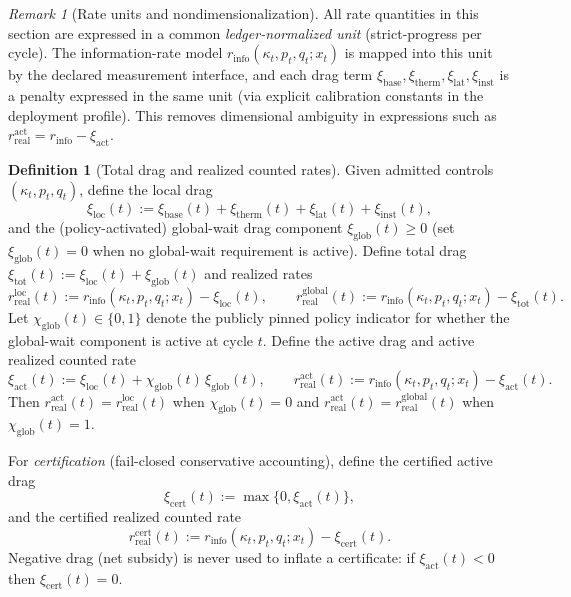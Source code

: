 \documentclass[11pt,a4paper]{article}
\theoremstyle{definition}
\newtheorem{definition}{Definition}
\theoremstyle{remark}
\newtheorem{remark}{Remark}
\begin{document}
\begin{remark}[Rate units and nondimensionalization]
All rate quantities in this section are expressed in a common \emph{ledger-normalized unit} (strict-progress per cycle). The information-rate model $r_{\mathrm{info}}(\kappa_t,p_t,q_t;x_t)$ is mapped into this unit by the declared measurement interface, and each drag term $\xi_{\mathrm{base}},\xi_{\mathrm{therm}},\xi_{\mathrm{lat}},\xi_{\mathrm{inst}}$ is a penalty expressed in the same unit (via explicit calibration constants in the deployment profile). This removes dimensional ambiguity in expressions such as $r_{\mathrm{real}}^{\mathrm{act}}=r_{\mathrm{info}}-\xi_{\mathrm{act}}$.
\end{remark}

\begin{definition}[Total drag and realized counted rates]\label{def:total_drag_and_realized_counted_rates}
Given admitted controls $(\kappa_t,p_t,q_t)$, define the local drag
\[
\xi_{\mathrm{loc}}(t):=\xi_{\mathrm{base}}(t)+\xi_{\mathrm{therm}}(t)+\xi_{\mathrm{lat}}(t)+\xi_{\mathrm{inst}}(t),
\]
and the (policy-activated) global-wait drag component $\xi_{\mathrm{glob}}(t)\ge 0$ (set $\xi_{\mathrm{glob}}(t)=0$ when no global-wait requirement is active).
Define total drag $\xi_{\mathrm{tot}}(t):=\xi_{\mathrm{loc}}(t)+\xi_{\mathrm{glob}}(t)$ and realized rates
\[
r_{\mathrm{real}}^{\mathrm{loc}}(t):=r_{\mathrm{info}}(\kappa_t,p_t,q_t;x_t)-\xi_{\mathrm{loc}}(t),
\qquad
r_{\mathrm{real}}^{\mathrm{global}}(t):=r_{\mathrm{info}}(\kappa_t,p_t,q_t;x_t)-\xi_{\mathrm{tot}}(t).
\]
Let $\chi_{\mathrm{glob}}(t)\in\{0,1\}$ denote the publicly pinned policy indicator for whether the global-wait component is active at cycle $t$.
Define the active drag and active realized counted rate
\[
\xi_{\mathrm{act}}(t):=\xi_{\mathrm{loc}}(t)+\chi_{\mathrm{glob}}(t)\,\xi_{\mathrm{glob}}(t),
\qquad
r_{\mathrm{real}}^{\mathrm{act}}(t):=r_{\mathrm{info}}(\kappa_t,p_t,q_t;x_t)-\xi_{\mathrm{act}}(t).
\]
Then $r_{\mathrm{real}}^{\mathrm{act}}(t)=r_{\mathrm{real}}^{\mathrm{loc}}(t)$ when $\chi_{\mathrm{glob}}(t)=0$ and $r_{\mathrm{real}}^{\mathrm{act}}(t)=r_{\mathrm{real}}^{\mathrm{global}}(t)$ when $\chi_{\mathrm{glob}}(t)=1$.


For \emph{certification} (fail-closed conservative accounting), define the certified active drag
\[
\xi_{\mathrm{cert}}(t):=\max\{0,\xi_{\mathrm{act}}(t)\},
\]
and the certified realized counted rate
\[
r_{\mathrm{real}}^{\mathrm{cert}}(t):=r_{\mathrm{info}}(\kappa_t,p_t,q_t;x_t)-\xi_{\mathrm{cert}}(t).
\]
Negative drag (net subsidy) is never used to inflate a certificate: if $\xi_{\mathrm{act}}(t)<0$ then $\xi_{\mathrm{cert}}(t)=0$.
\end{definition}
\end{document}
